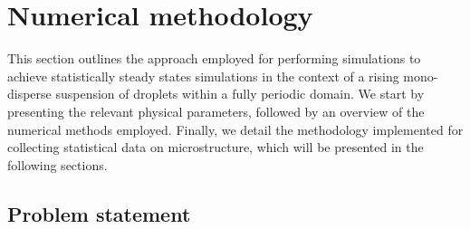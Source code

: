 \section{Numerical methodology}
\label{sec:methodo}


This section outlines the approach employed for performing simulations to achieve statistically steady states simulations in the context of a rising mono-disperse suspension of droplets within a fully periodic domain.
We start by presenting the relevant physical parameters, followed by an overview of the numerical methods employed.
Finally, we detail the methodology implemented for collecting statistical data on microstructure, which will be presented in the following sections.



\subsection{Problem statement}


